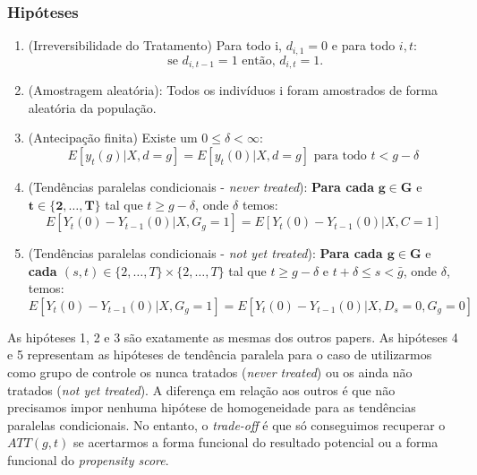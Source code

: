 \documentclass[portugues]{article}
\begin{document}
\subsubsection{Hipóteses} \label{cap:Hip_CeS}

\begin{boxB}
    \begin{enumerate}

        \item (Irreversibilidade do Tratamento) Para todo i, $d_{i,1} = 0$ e para todo $i,t$:
        $$ \text{ se } d_{i,t-1} = 1 \text{ então, } d_{i,t} = 1. $$
        \item (Amostragem aleatória): Todos os indivíduos i foram amostrados de forma aleatória da população.
        \item (Antecipação finita) Existe um $ 0 \leq \delta < \infty$:
        $$E[y_t(g)|X, d=g] = E[y_t(0)|X, d=g] \text{ para todo } t < g-\delta $$
        \item (Tendências paralelas condicionais - \textit{never treated}): \textbf{Para cada} \(\mathbf{g \in G} \) e \( \mathbf{t \in \{2, \ldots, T\}} \) tal que \( t \geq g - \delta \), onde \( \delta \) temos:
        $$  E[Y_t(0) - Y_{t-1}(0) | X, G_g = 1] = E[Y_t(0) - Y_{t-1}(0) | X, C = 1] $$
        \item (Tendências paralelas condicionais - \textit{not yet treated}): \textbf{Para cada \(\mathbf{ g \in G }\)} e \textbf{cada \( (s, t) \in \{2, \ldots, T\} \times \{2, \ldots, T\} \)} tal que \( t \geq g - \delta \) e \( t + \delta \leq s < \bar{g} \), onde \( \delta \), temos:
         $$ E[Y_t(0) - Y_{t-1}(0) | X, G_g = 1] = E[Y_t(0) - Y_{t-1}(0) | X, D_s = 0, G_g = 0] $$
         
    \end{enumerate}
    \citep{callaway2021difference}
\end{boxB}

As hipóteses 1, 2 e 3 são exatamente as mesmas dos outros papers. As hipóteses 4 e 5 representam as hipóteses de tendência paralela para o caso de utilizarmos como grupo de controle os nunca tratados (\textit{never treated}) ou os ainda não tratados (\textit{not yet treated}). A diferença em relação aos outros é que não precisamos impor nenhuma hipótese de homogeneidade para as tendências paralelas condicionais. No entanto, o \textit{trade-off} é que só conseguimos recuperar o $ATT(g,t)$ se acertarmos a forma funcional do resultado potencial ou a forma funcional do \textit{propensity score}.
\end{document}
